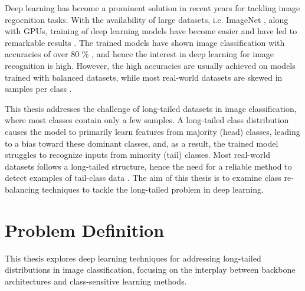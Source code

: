 \label{sec:introduction}

Deep learning has become a prominent solution in recent years for tackling image regocnition tasks. With the availability of large datasets, i.e. ImageNet \cite{ImageNet2009}, along with GPUs, training of deep learning models have become easier and have led to remarkable results \cite{Goodfellow-et-al-2016}. The trained models have shown image classification with accuracies of over 80 \% \cite{he2015deepresiduallearningimage,dosovitskiy2021imageworth16x16words}, and hence the interest in deep learning for image recognition is high. However, the high accuracies are usually achieved on models trained with balanced datasets, while most real-world datasets are skewed in samples per class \cite{vanhorn2017deviltailsfinegrainedclassification,Buda_2018,liu2019largescalelongtailedrecognitionopen}.  

This thesis addresses the challenge of long-tailed datasets in image classification, where most classes contain only a few samples. A long-tailed class distribution causes the model to primarily learn features from majority (head) classes, leading to a bias toward these dominant classes, and, as a result, the trained model struggles to recognize inputs from minority (tail) classes. Most real-world datasets follows a long-tailed structure, hence the need for a reliable method to detect examples of tail-class data \cite{vanhorn2018inaturalistspeciesclassificationdetection,zhang2023deep}. The aim of this thesis is to examine class re-balancing techniques to tackle the long-tailed problem in deep learning.


\section{Problem Definition}
This thesis explores deep learning techniques for addressing long-tailed distributions in image classification, focusing on the interplay between backbone architectures and class-sensitive learning methods.

